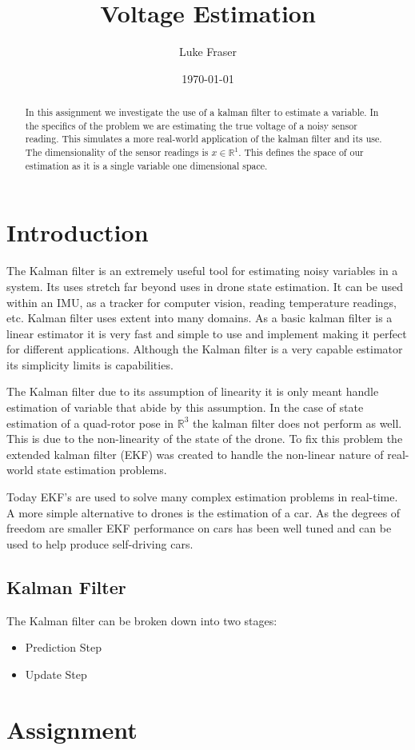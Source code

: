 \documentclass[letter]{IEEEtran}
\title{Voltage Estimation}
\date{\today}
\begin{document}
\author{Luke Fraser}
\maketitle
\begin{abstract}
In this assignment we investigate the use of a kalman filter to estimate a variable. In the specifics of the problem we are estimating the true voltage of a noisy sensor reading. This simulates a more real-world application of the kalman filter and its use. The dimensionality of the sensor readings is $x \in \mathbb{R}^1$. This defines the space of our estimation as it is a single variable one dimensional space.
\end{abstract}

\section{Introduction}
The Kalman filter is an extremely useful tool for estimating noisy variables in a system. Its uses stretch far beyond uses in drone state estimation. It can be used within an IMU, as a tracker for computer vision, reading temperature readings, etc. Kalman filter uses extent into many domains. As a basic kalman filter is a linear estimator it is very fast and simple to use and implement making it perfect for different applications. Although the Kalman filter is a very capable estimator its simplicity limits is capabilities.

The Kalman filter due to its assumption of linearity it is only meant handle estimation of variable that abide by this assumption. In the case of state estimation of a quad-rotor pose in $\mathbb{R}^3$ the kalman filter does not perform as well. This is due to the non-linearity of the state of the drone. To fix this problem the extended kalman filter (EKF) was created to handle the non-linear nature of real-world state estimation problems.

Today EKF's are used to solve many complex estimation problems in real-time. A more simple alternative to drones is the estimation of a car. As the degrees of freedom are smaller EKF performance on cars has been well tuned and can be used to help produce self-driving cars.

\subsection{Kalman Filter}
The Kalman filter can be broken down into two stages:
\begin{itemize}
\item Prediction Step
\item Update Step
\end{itemize}
\section{Assignment}
\end{document}
